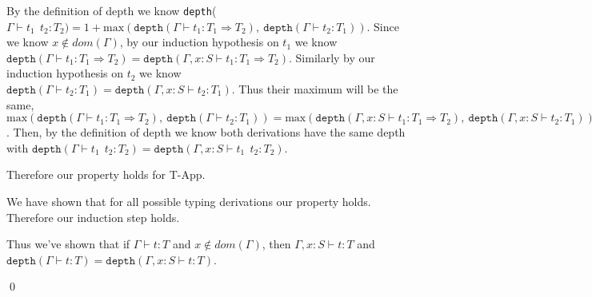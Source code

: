 \documentclass[12pt, fleqn]{article}
\begin{document}
By the definition of depth we know \texttt{depth}($\Gamma \vdash t_1\:\:t_2 : T_2) = 1 + \textrm{max}(
\texttt{depth}(\Gamma \vdash t_1 : T_1 \Rightarrow T_2),~\texttt{depth}(\Gamma \vdash t_2 : T_1))$. Since we know
$x \notin dom(\Gamma)$, by our induction hypothesis on $t_1$ we know 
$\texttt{depth}(\Gamma \vdash t_1 : T_1 \Rightarrow T_2) = \texttt{depth}(\Gamma, x: S \vdash t_1 : T_1 \Rightarrow T_2)$. Similarly
by our induction hypothesis on $t_2$ we know $\texttt{depth}(\Gamma \vdash t_2 : T_1) = \texttt{depth}(\Gamma, x:S \vdash t_2 : T_1)$.
Thus their maximum will be the same, $\textrm{max}(
    \texttt{depth}(\Gamma \vdash t_1 : T_1 \Rightarrow T_2),~\texttt{depth}(\Gamma \vdash t_2 : T_1))
= \textrm{max}(
    \texttt{depth}(\Gamma, x: S \vdash t_1 : T_1 \Rightarrow T_2),~\texttt{depth}(\Gamma, x: S \vdash t_2 : T_1))$.
Then, by the definition of depth we know both derivations have the same depth with
$\texttt{depth}(\Gamma \vdash t_1\:\:t_2 : T_2) = \texttt{depth}(\Gamma, x: S \vdash t_1\:\:t_2 : T_2)$.

Therefore our property holds for T-App.

We have shown that for all possible typing derivations our property holds. Therefore our induction step holds.

Thus we've shown that if $\Gamma \vdash t : T$ and $x \notin dom(\Gamma)$, then $\Gamma, x: S \vdash t : T$
and $\texttt{depth}(\Gamma \vdash t : T) = \texttt{depth}(\Gamma, x : S \vdash t : T)$.

\qed
\end{document}
